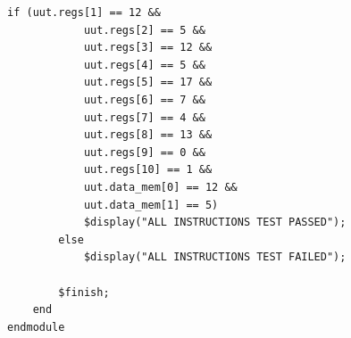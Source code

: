 \documentclass[conference]{IEEEtran}
\begin{document}
\begin{lstlisting}[caption={Complete processor_all_tb.v source code},label={lst:testbench}]
        if (uut.regs[1] == 12 &&
            uut.regs[2] == 5 &&
            uut.regs[3] == 12 &&
            uut.regs[4] == 5 &&
            uut.regs[5] == 17 &&
            uut.regs[6] == 7 &&
            uut.regs[7] == 4 &&
            uut.regs[8] == 13 &&
            uut.regs[9] == 0 &&
            uut.regs[10] == 1 &&
            uut.data_mem[0] == 12 &&
            uut.data_mem[1] == 5)
            $display("ALL INSTRUCTIONS TEST PASSED");
        else
            $display("ALL INSTRUCTIONS TEST FAILED");

        $finish;
    end
endmodule
\end{lstlisting}
\end{document}
